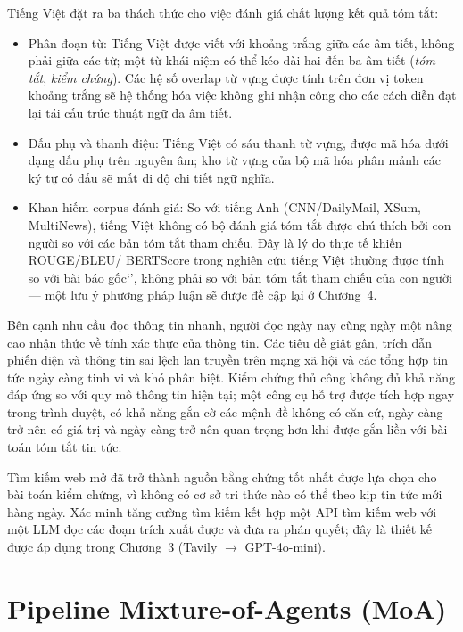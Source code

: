 Tiếng Việt đặt ra ba thách thức cho việc đánh giá chất lượng kết quả tóm tắt:
\begin{itemize}
  \item {Phân đoạn từ:} Tiếng Việt được viết
        với khoảng trắng giữa các âm tiết, không phải giữa các từ; một từ
        khái niệm có thể kéo dài hai đến ba âm tiết
        (\textit{tóm tắt}, \textit{kiểm chứng}). Các hệ số overlap từ vựng
        được tính trên đơn vị token khoảng trắng sẽ hệ thống hóa việc
        không ghi nhận công cho các cách diễn đạt lại tái cấu trúc thuật
        ngữ đa âm tiết.
  \item {Dấu phụ và thanh điệu:} Tiếng Việt có sáu thanh từ vựng,
        được mã hóa dưới dạng dấu phụ trên nguyên âm; kho từ vựng của bộ
        mã hóa phân mảnh các ký tự có dấu sẽ mất đi độ chi tiết ngữ nghĩa.
  \item {Khan hiếm corpus đánh giá:} So với tiếng Anh
        (CNN/DailyMail, XSum, MultiNews), tiếng Việt không có bộ đánh giá
        tóm tắt được chú thích bởi con người so với 
        các bản tóm tắt tham chiếu. Đây là lý do thực tế khiến ROUGE/BLEU/
        BERTScore trong nghiên cứu tiếng Việt thường được tính
        so với bài báo gốc`', không phải so với bản tóm tắt tham
        chiếu của con người --- một lưu ý phương pháp luận sẽ được đề cập
        lại ở Chương~4.
\end{itemize}

Bên cạnh nhu cầu đọc thông tin nhanh, người đọc ngày nay cũng ngày một nâng cao nhận thức về tính xác thực của thông tin.
Các tiêu đề giật gân, trích dẫn phiến diện và thông tin sai lệch lan truyền trên mạng xã hội và các tổng hợp tin tức ngày càng tinh vi và khó phân biệt.
Kiểm chứng thủ công không đủ khả năng đáp ứng so với quy mô thông tin hiện tại; một công cụ hỗ trợ được tích hợp ngay trong trình duyệt, có khả năng
gắn cờ các mệnh đề không có căn cứ, ngày càng trở nên có giá trị và ngày càng trở nên quan trọng hơn khi được gắn liền với bài toán tóm tắt tin tức.

Tìm kiếm web mở đã trở thành nguồn bằng chứng tốt nhất được lựa chọn cho bài toán kiểm chứng, vì không có cơ sở tri thức nào có thể theo kịp tin tức
mới hàng ngày. Xác minh tăng cường tìm kiếm kết hợp một API tìm kiếm web
với một LLM đọc các đoạn trích xuất được và đưa ra phán quyết; đây
là thiết kế được áp dụng trong Chương~3 (Tavily $\rightarrow$ GPT-4o-mini).

\section{Pipeline Mixture-of-Agents (MoA)}

